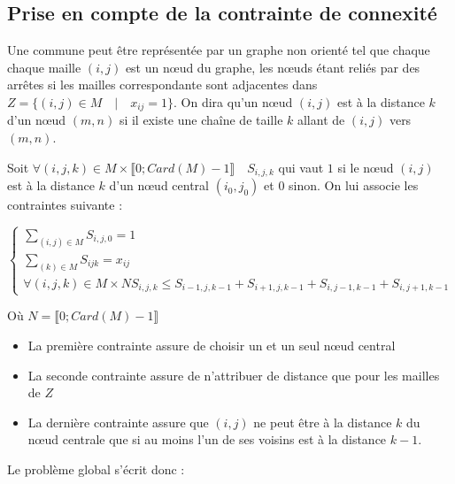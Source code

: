 \documentclass[a4paper,11pt] {article}
\begin{document}
\subsection{Prise en compte de la contrainte de connexité}

Une commune peut être représentée par un graphe non orienté tel que chaque chaque maille $(i,j)$ est un nœud du graphe, les nœuds étant reliés par des arrêtes si les mailles correspondante sont adjacentes dans $Z=\{(i,j)\in M\quad |\quad x_{ij}=1\}$. On dira qu'un nœud $(i,j)$ est à la distance $k$ d'un nœud $(m,n)$ si il existe une chaîne de taille $k$ allant de $(i,j)$ vers $(m,n)$.


Soit $\forall{(i,j,k)}\in M\times\llbracket 0;Card(M)-1\rrbracket \quad S_{i,j,k}$ qui vaut $1$ si le nœud $(i,j)$ est à la distance $k$ d'un nœud central $(i_0,j_0)$ et $0$ sinon. On lui associe les contraintes suivante : 

\begin{equation}
\left\{
\begin{array}{l}
\sum\limits_{(i,j)\in M} S_{i,j,0} = 1\\
\sum\limits_{(k)\in M} S_{ijk} = x_{ij}\\
\forall{(i,j,k)}\in M\times N S_{i,j,k}\leq S_{i-1,j,k-1} + S_{i+1,j,k-1} + S_{i,j-1,k-1} + S_{i,j+1,k-1}
\end{array}
\right.
\end{equation}

Où $N = \llbracket 0;Card(M)-1\rrbracket$

\begin{itemize}
\item La première contrainte assure de choisir un et un seul nœud central
\item La seconde contrainte assure de n'attribuer de distance que pour les mailles de $Z$
\item La dernière contrainte assure que $(i,j)$ ne peut être à la distance $k$ du nœud centrale que si au moins l'un de ses voisins est à la distance $k-1$.
\end{itemize}

Le problème global s'écrit donc : 
\end{document}
